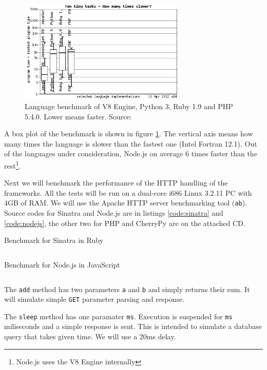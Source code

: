 \documentclass[12pt,oneside]{fithesis}
\begin{document}
		\begin{figure}[htb]
	  \centering
	    \includegraphics[width=0.7\textwidth]{bench2.png}
		  \caption{Language benchmark of V8 Engine, Python 3, Ruby 1.9 and PHP 5.4.0. Lower means faster. Source: \cite{website:bench}}
		  \label{fig:bench1}
		\end{figure}
		
		A box plot of the benchmark is shown in figure \ref{fig:bench1}. The vertical axis means how many times the language is slower than the fastest one (Intel Fortran 12.1). Out of the languages under consideration, Node.js on average 6 times faster than the rest\footnote{Node.js uses the V8 Engine internally}. 
		
		Next we will benchmark the performance of the HTTP handling of the frameworks. All the tests will be run on a dual-core i686 Linux 3.2.11 PC with 4GB of RAM. We will use the Apache HTTP server benchmarking tool (\texttt{ab}). Source codes for Sinatra and Node.js are in listings \ref{code:sinatra} and \ref{code:nodejs}, the other two for PHP and CherryPy are on the attached CD.

		\begin{program}
		\caption{Benchmark for Sinatra in Ruby}
		\label{code:sinatra}
		\inputminted[fontsize=\footnotesize]{ruby}{../bench/sinatra/app.rb} 
		\end{program}
		
		\begin{program}
		\caption{Benchmark for Node.js in JavaScript}
		\label{code:nodejs}
		\inputminted[fontsize=\footnotesize]{javascript}{../bench/nodejs/app.js}
		\end{program}

		The \texttt{add} method has two parameters \texttt{a} and \texttt{b} and simply returns their sum. It will simulate simple \texttt{GET} parameter parsing and response.
		
		The \texttt{sleep} method has one paramater \texttt{ms}. Execution is suspended for \texttt{ms} miliseconds and a simple response is sent. This is intended to simulate a database query that takes given time. We will use a 20ms delay.
		
\end{document}
